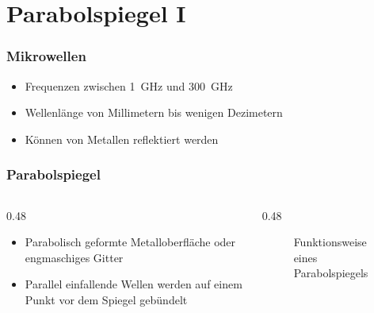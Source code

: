 \section{Parabolspiegel I}
\label{section:parabolspiegel_1}
\begin{frame}%
    \frametitle{Mikrowellen}
    \begin{itemize}
        \item Frequenzen zwischen \qty{1}{\giga\hertz} und \qty{300}{\giga\hertz}
        \item Wellenlänge von Millimetern bis wenigen Dezimetern
        \item Können von Metallen reflektiert werden
    \end{itemize}
\end{frame}

\begin{frame}
    \frametitle{Parabolspiegel}
    \begin{columns}
        \begin{column}{0.48\textwidth}
            \begin{itemize}
                \item Parabolisch geformte Metalloberfläche oder engmaschiges Gitter
                \item Parallel einfallende Wellen werden auf einem Punkt vor dem Spiegel gebündelt
            \end{itemize}
        \end{column}
        \begin{column}{0.48\textwidth}
            \begin{figure}
                \caption{\scriptsize Funktionsweise eines Parabolspiegels}
                \label{e_parabolspiegel_funktion}
            \end{figure}
        \end{column}
    \end{columns}
\end{frame}


